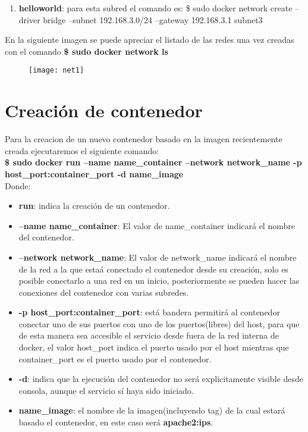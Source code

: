 \documentclass[10pt,letterpaper]{article}
\begin{document}
\begin{enumerate}
\begin{enumerate}
\item \textbf{helloworld}: para esta subred el comando es: \$ sudo docker network create --driver bridge --subnet 192.168.3.0/24 --gateway 192.168.3.1 subnet3 \\
\end{enumerate}

En la siguiente imagen se puede apreciar el listado de las redes una vez creadas con el comando \textbf{\$ sudo docker network ls}\\

\begin{figure}[h!]
\texttt{[image: net1]}
\centering
\end{figure}

\clearpage
\section{Creaci\'on de contenedor}

Para la creacion de un nuevo contenedor basado en la imagen recientemente creada ejecutaremos el siguiente comando: \\

\textbf{\$ sudo docker run --name name\_container --network network\_name -p host\_port:container\_port -d name\_image}\\

Donde: \\
\begin{itemize}
\item \textbf{run}: indica la creaci\'on de un contenedor.
\item \textbf{--name name\_container}: El valor de name\_container indicar\'a el nombre del contenedor.
\item \textbf{--network network\_name}: El valor de network\_name indicar\'a el nombre de la red a la que esta\'a conectado el contenedor desde su creaci\'on, solo es posible conectarlo a una red en un inicio, posteriormente se pueden hacer las conexiones del contenedor con varias subredes.
\item \textbf{-p host\_port:container\_port}: est\'a bandera permitir\'a al contenedor conectar uno de sus puertos con uno de los puertos(libres) del host, para que de esta manera sea accesible el servicio desde fuera de la red interna de docker, el valor host\_port indica el puerto usado por el host mientras que container\_port es el puerto usado por el contenedor.
\item \textbf{-d}: indica que la ejecuci\'on del contenedor no ser\'a explicitamente visible desde consola, aunque el servicio s\'i haya sido iniciado.
\item \textbf{name\_image}: el nombre de la imagen(incluyendo tag) de la cual estar\'a basado el contenedor, en este caso ser\'a \textbf{apache2:ips}.
\end{itemize}


\end{enumerate}
\end{document}

